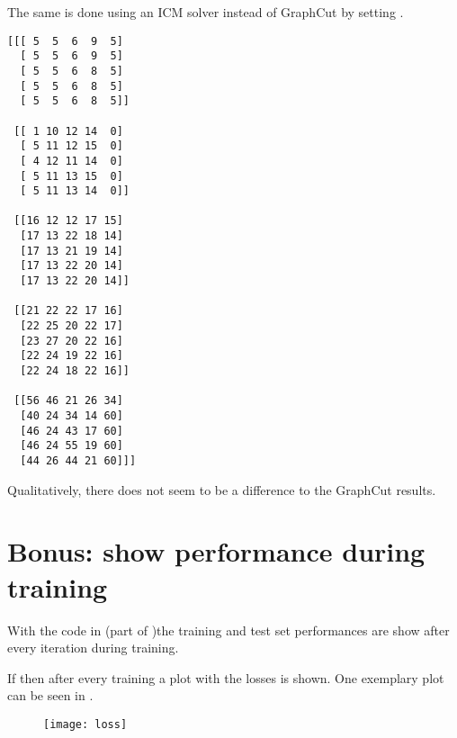 \documentclass[12pt]{scrartcl}
\begin{document}
The same is done using an ICM solver instead of GraphCut by setting .

\begin{verbatim}
[[[ 5  5  6  9  5]
  [ 5  5  6  9  5]
  [ 5  5  6  8  5]
  [ 5  5  6  8  5]
  [ 5  5  6  8  5]]

 [[ 1 10 12 14  0]
  [ 5 11 12 15  0]
  [ 4 12 11 14  0]
  [ 5 11 13 15  0]
  [ 5 11 13 14  0]]

 [[16 12 12 17 15]
  [17 13 22 18 14]
  [17 13 21 19 14]
  [17 13 22 20 14]
  [17 13 22 20 14]]

 [[21 22 22 17 16]
  [22 25 20 22 17]
  [23 27 20 22 16]
  [22 24 19 22 16]
  [22 24 18 22 16]]

 [[56 46 21 26 34]
  [40 24 34 14 60]
  [46 24 43 17 60]
  [46 24 55 19 60]
  [44 26 44 21 60]]]
\end{verbatim}

Qualitatively, there does not seem to be a difference to the GraphCut results.

\section{Bonus: show performance during training}

With the code in  (part of )the training and test set performances are show after every iteration during training.

If  then after every training a plot with the losses is shown. One exemplary plot can be seen in .

\begin{figure}
    \centering
    \texttt{[image: loss]}
    \label{fig:bonus}
\end{figure}





\clearpage

\end{document}
